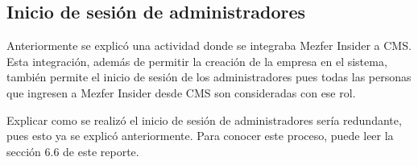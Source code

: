\subsection{Inicio de sesión de administradores}
Anteriormente se explicó una actividad donde se integraba Mezfer Insider a CMS. Esta integración, además de permitir la creación de la empresa en el sistema, también permite el inicio de sesión de los administradores pues todas las personas que ingresen a Mezfer Insider desde CMS son consideradas con ese rol.

Explicar como se realizó el inicio de sesión de administradores sería redundante, pues esto ya se explicó anteriormente. Para conocer este proceso, puede leer la sección 6.6 de este reporte.
